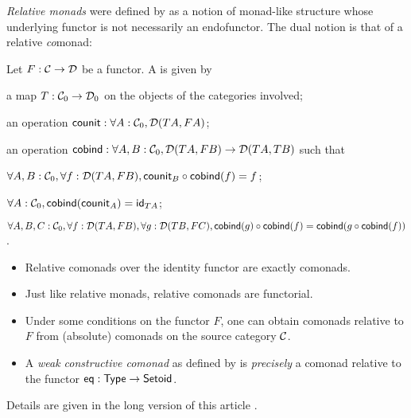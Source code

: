 \documentclass[envcountsame]{llncs}
\begin{document}
\emph{Relative monads} were defined by \textcite{DBLP:conf/fossacs/AltenkirchCU10} as a notion of monad-like structure
whose underlying functor is not necessarily an endofunctor.
The dual notion is that of a relative \emph{co}monad:

\begin{definition}%
 \label{def:rel_comonad}
  Let $F:\C\to\D$ be a functor. A  is given by
  \begin{packitem}
   \item a map $T:\C_0 \to \D_0$ on the objects of the categories involved;
   \item an operation $\counit : \forall A : \C_0, \D(TA,FA)$;
   \item an operation $\cobind: \forall A,B:\C_0, \D(TA,FB) \to \D(TA,TB)$
   such that
   \item $\forall A,B:\C_0, \forall f:\D(TA,FB), \comp{\cobind(f)}{\counit_B} = f$;
   \item $\forall A : \C_0, \cobind(\counit_A) = \id_{TA}$;
   \item $\forall A,B,C:\C_0, \forall f : \D(TA,FB),\forall g:\D(TB,FC), \\
        \comp{\cobind(f)}{\cobind(g)} = \cobind(\comp{\cobind(f)}{g})$.
  \end{packitem} 
\end{definition}

\begin{Short}
\begin{remark}\label{def:lift}
 \begin{itemize}
  \item Relative comonads over the identity functor are exactly comonads.
  \item Just like relative monads, relative comonads are functorial.
  \item Under some conditions on the functor $F$, one can obtain comonads relative to $F$ from (absolute) comonads on the 
 source category $\C$.
  \item A \emph{weak constructive comonad} as defined by \textcite{DBLP:conf/types/MatthesP11}  is \emph{precisely}
  a comonad relative to the functor $\eq : \Set\to\Setoid$.
 \end{itemize}
\noindent
Details are given in the long version of this article \parencite{trimat_coq}.
\end{remark}
\end{Short}
\end{document}
